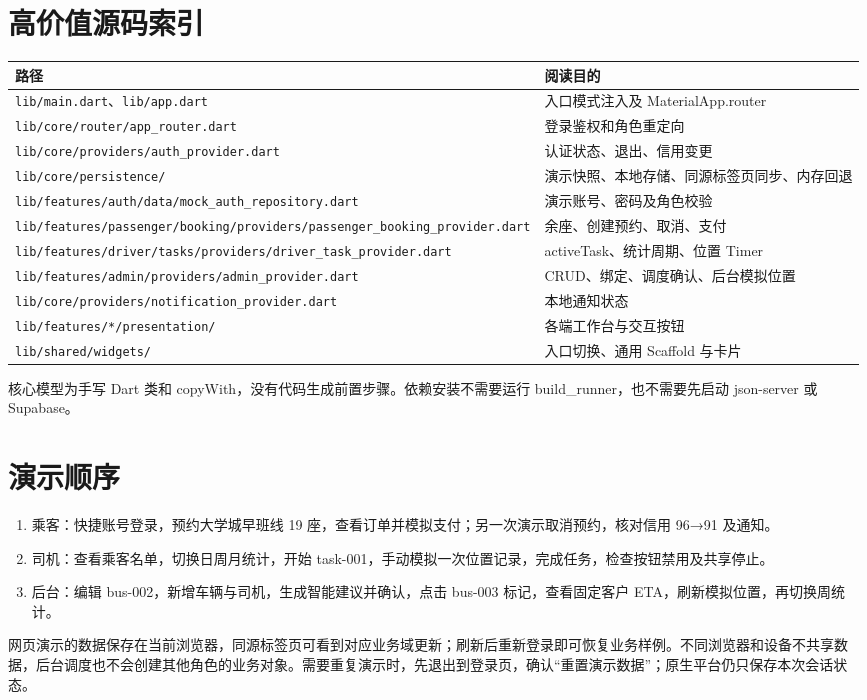 \documentclass[UTF8,fontset=fandol,zihao=-4,oneside]{ctexrep}
\newcommand{\pathcode}[1]{\nolinkurl{#1}}
\begin{document}
\section{高价值源码索引}
\begin{longtable}{p{7.6cm}p{7.1cm}}
\toprule 路径 & 阅读目的 \\ \midrule
\pathcode{lib/main.dart}、\pathcode{lib/app.dart} & 入口模式注入及 MaterialApp.router \\
\pathcode{lib/core/router/app_router.dart} & 登录鉴权和角色重定向 \\
\pathcode{lib/core/providers/auth_provider.dart} & 认证状态、退出、信用变更 \\
\pathcode{lib/core/persistence/} & 演示快照、本地存储、同源标签页同步、内存回退 \\
\pathcode{lib/features/auth/data/mock_auth_repository.dart} & 演示账号、密码及角色校验 \\
\pathcode{lib/features/passenger/booking/providers/passenger_booking_provider.dart} & 余座、创建预约、取消、支付 \\
\pathcode{lib/features/driver/tasks/providers/driver_task_provider.dart} & activeTask、统计周期、位置 Timer \\
\pathcode{lib/features/admin/providers/admin_provider.dart} & CRUD、绑定、调度确认、后台模拟位置 \\
\pathcode{lib/core/providers/notification_provider.dart} & 本地通知状态 \\
\pathcode{lib/features/*/presentation/} & 各端工作台与交互按钮 \\
\pathcode{lib/shared/widgets/} & 入口切换、通用 Scaffold 与卡片 \\
\bottomrule
\end{longtable}
核心模型为手写 Dart 类和 copyWith，没有代码生成前置步骤。依赖安装不需要运行 build\_runner，也不需要先启动 json-server 或 Supabase。

\section{演示顺序}
\begin{enumerate}
\item 乘客：快捷账号登录，预约大学城早班线 19 座，查看订单并模拟支付；另一次演示取消预约，核对信用 96→91 及通知。
\item 司机：查看乘客名单，切换日周月统计，开始 task-001，手动模拟一次位置记录，完成任务，检查按钮禁用及共享停止。
\item 后台：编辑 bus-002，新增车辆与司机，生成智能建议并确认，点击 bus-003 标记，查看固定客户 ETA，刷新模拟位置，再切换周统计。
\end{enumerate}
网页演示的数据保存在当前浏览器，同源标签页可看到对应业务域更新；刷新后重新登录即可恢复业务样例。不同浏览器和设备不共享数据，后台调度也不会创建其他角色的业务对象。需要重复演示时，先退出到登录页，确认“重置演示数据”；原生平台仍只保存本次会话状态。
\end{document}
